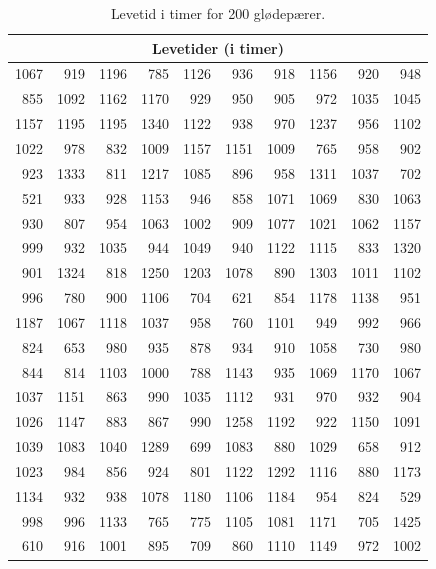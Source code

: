 \begin{table}[h!]
\centering
\small %
\renewcommand{\arraystretch}{1.2}
{
\begin{tabular}{rrrrrrrrrr}
\toprule
\multicolumn{10}{c}{\textbf{Levetider (i timer)}} \\
\midrule
1067 & 919 & 1196 & 785 & 1126 & 936 & 918 & 1156 & 920 & 948 \\
855 & 1092 & 1162 & 1170 & 929 & 950 & 905 & 972 & 1035 & 1045 \\
1157 & 1195 & 1195 & 1340 & 1122 & 938 & 970 & 1237 & 956 & 1102 \\
1022 & 978 & 832 & 1009 & 1157 & 1151 & 1009 & 765 & 958 & 902 \\
923 & 1333 & 811 & 1217 & 1085 & 896 & 958 & 1311 & 1037 & 702 \\
521 & 933 & 928 & 1153 & 946 & 858 & 1071 & 1069 & 830 & 1063 \\
930 & 807 & 954 & 1063 & 1002 & 909 & 1077 & 1021 & 1062 & 1157 \\
999 & 932 & 1035 & 944 & 1049 & 940 & 1122 & 1115 & 833 & 1320 \\
901 & 1324 & 818 & 1250 & 1203 & 1078 & 890 & 1303 & 1011 & 1102 \\
996 & 780 & 900 & 1106 & 704 & 621 & 854 & 1178 & 1138 & 951 \\
1187 & 1067 & 1118 & 1037 & 958 & 760 & 1101 & 949 & 992 & 966 \\
824 & 653 & 980 & 935 & 878 & 934 & 910 & 1058 & 730 & 980 \\
844 & 814 & 1103 & 1000 & 788 & 1143 & 935 & 1069 & 1170 & 1067 \\
1037 & 1151 & 863 & 990 & 1035 & 1112 & 931 & 970 & 932 & 904 \\
1026 & 1147 & 883 & 867 & 990 & 1258 & 1192 & 922 & 1150 & 1091 \\
1039 & 1083 & 1040 & 1289 & 699 & 1083 & 880 & 1029 & 658 & 912 \\
1023 & 984 & 856 & 924 & 801 & 1122 & 1292 & 1116 & 880 & 1173 \\
1134 & 932 & 938 & 1078 & 1180 & 1106 & 1184 & 954 & 824 & 529 \\
998 & 996 & 1133 & 765 & 775 & 1105 & 1081 & 1171 & 705 & 1425 \\
610 & 916 & 1001 & 895 & 709 & 860 & 1110 & 1149 & 972 & 1002 \\
\bottomrule
\end{tabular}
}
\caption{Levetid i timer for 200 glødepærer.}
\label{tab:lamp_life_raw}
\end{table}

